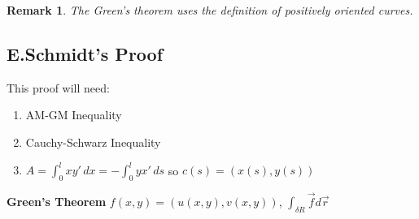 \documentclass[a4paper]{book}
\newtheorem{remark}[theorem]{Remark}%
\numberwithin{theorem}{section}%
\begin{document}
\begin{remark}
    The Green's theorem uses the definition of positively oriented curves.
\end{remark}

\subsection{E.Schmidt's Proof}
This proof will need:
\begin{enumerate}
	\item AM-GM Inequality 
	\item Cauchy-Schwarz Inequality
	\item $A=\int_{0}^{l} xy' \,dx = -\int_{0}^{l} yx' \,ds$ so $c(s)=(x(s),y(s))$
\end{enumerate}
\textbf{Green's Theorem} $f(x,y)=(u(x,y),v(x,y))$, $\int_{\delta R}\overrightarrow{f} d\overrightarrow{r}$
\end{document}

